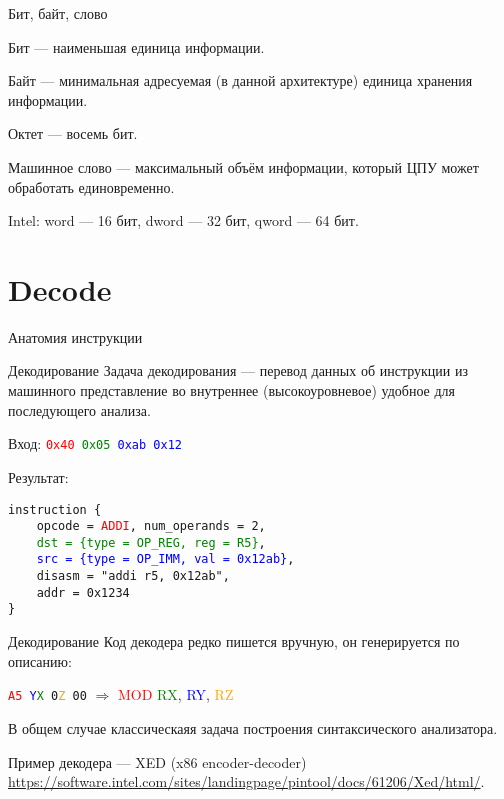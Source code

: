 \begin{frame}{Бит, байт, слово}

Бит \pause --- наименьшая единица информации.

\pause\bigskip

Байт \pause --- минимальная адресуемая (в данной архитектуре) единица хранения
информации.

\pause\bigskip

Октет --- восемь бит.

\pause\bigskip

Машинное слово \pause --- максимальный объём информации, который ЦПУ может
обработать единовременно.

\pause\bigskip

Intel: word — 16 бит, dword — 32 бит, qword — 64 бит.

\end{frame}

\section{Decode}

\begin{frame}{Анатомия инструкции}
\centering
{}
\end{frame}

\begin{frame}{Декодирование}
Задача декодирования --- перевод данных об инструкции из машинного представление
во внутреннее (высокоуровневое) удобное для последующего анализа.

\pause

Вход: \texttt{\textcolor{red}{0x40} \textcolor{green}{0x05} \textcolor{blue}{0xab 0x12}}

Результат:

\texttt{instruction \{ \\
~~~~opcode = \textcolor{red}{ADDI}, num\_operands = 2, \\
~~~~\textcolor{green}{dst = \{type = OP\_REG, reg = R5\}}, \\
~~~~\textcolor{blue}{src = \{type = OP\_IMM, val = 0x12ab\}}, \\
~~~~disasm = "addi r5, 0x12ab", \\
~~~~addr = 0x1234 \\
\}}

\end{frame}

\begin{frame}{Декодирование}
Код декодера редко пишется вручную, он генерируется по описанию:

\texttt{\textcolor{red}{A5} \textcolor{blue}{Y}\textcolor{green}{X} 0\textcolor{orange}{Z} 00} $\Rightarrow$ \textcolor{red}{MOD} \textcolor{green}{RX}, \textcolor{blue}{RY}, \textcolor{orange}{RZ}

\pause\bigskip

В общем случае классическаяя задача построения  синтаксического анализатора.

\pause\bigskip

Пример декодера --- XED (x86 encoder-decoder) \url{https://software.intel.com/sites/landingpage/pintool/docs/61206/Xed/html/}.
\end{frame}

